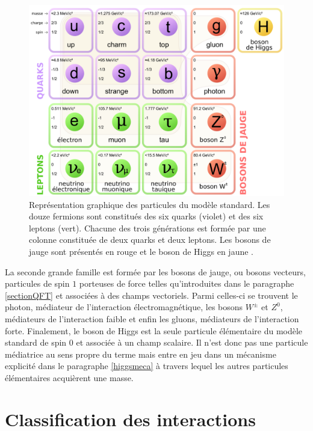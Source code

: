     \begin{figure}
    \centering
        \includegraphics[scale=0.22]{Chapitre2/Images/MS.png} 
        \caption{Représentation graphique des particules du modèle standard. Les douze fermions sont constitués des six quarks (violet) et des six leptons (vert). Chacune des trois générations est formée par une colonne constituée de deux quarks et deux leptons. Les bosons de jauge sont présentés en rouge et le boson de Higgs en jaune \cite{particles}.}
    \label{MS}
    \end{figure}

    La seconde grande famille est formée par les bosons de jauge, ou bosons vecteurs, particules de spin $1$ porteuses de force telles qu'introduites dans le paragraphe \ref{sectionQFT} et associées à des champs vectoriels. Parmi celles-ci se trouvent le photon, médiateur de l'interaction électromagnétique, les bosons $W^{\pm}$ et $Z^0$, médiateurs de l'interaction faible et enfin les gluons, médiateurs de l'interaction forte. Finalement, le boson de Higgs est la seule particule élémentaire du modèle standard de spin $0$ et associée à un champ scalaire. Il n'est donc pas une particule médiatrice au sens propre du terme mais entre en jeu dans un mécanisme explicité dans le paragraphe \ref{higgsmeca} à travers lequel les autres particules élémentaires acquièrent une masse. 
    
    \section{Classification des interactions}

